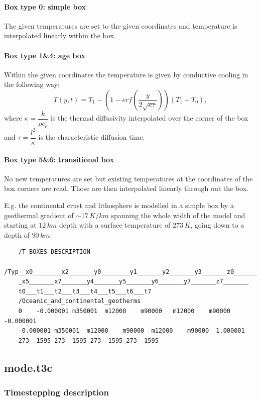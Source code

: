 \paragraph{Box type 0: simple box}
The given temperatures are set to the given coordinates and temperature is interpolated linearly within the box.

\paragraph{Box type 1\&4: age box}
Within the given coordinates the temperature is given by conductive cooling in the following way:
\begin{equation}\label{eqs:cond_cooling}
	T(y,t)=T_1-(1-erf(\dfrac{y}{2\sqrt{\kappa\tau}}))(T_1-T_0),
\end{equation}
where $\kappa=\dfrac{k}{\rho c_p}$ is the thermal diffusivity interpolated over the corner of the box and $\tau=\dfrac{l^2}{\kappa}$ is the characteristic diffusion time.

\paragraph{Box type 5\&6: transitional box}
No new temperatures are set but existing temperatures at the coordinates of the box corners are read. Those are then interpolated linearly through out the box.

E.g. the continental crust and lithosphere is modelled in a simple box by a geothermal gradient of $\sim17\,K/km$ spanning the whole width of the model and starting at $12\,km$ depth with a surface temperature of $273\,K$, going down to a depth of $90\,km$:
\lstset{basicstyle=\footnotesize}
\begin{lstlisting}
	/T_BOXES_DESCRIPTION
	/Typ__x0________x2_______y0________y1_______y2_______y3_______z0_______
	_x5_______x7_______y4_______y5_______y6_______y7_______z7_______
	t0___t1___t2___t3___t4___t5___t6___t7
	/Oceanic_and_continental_geotherms
	0    -0.000001 m350001  m12000    m90000   m12000    m90000 -0.000001
	-0.000001 m350001  m12000    m90000  m12000    m90000  1.000001
	273  1595 273  1595 273  1595 273  1595
\end{lstlisting}

\pagebreak

\subsection{mode.t3c}

\subsubsection{Timestepping description}

